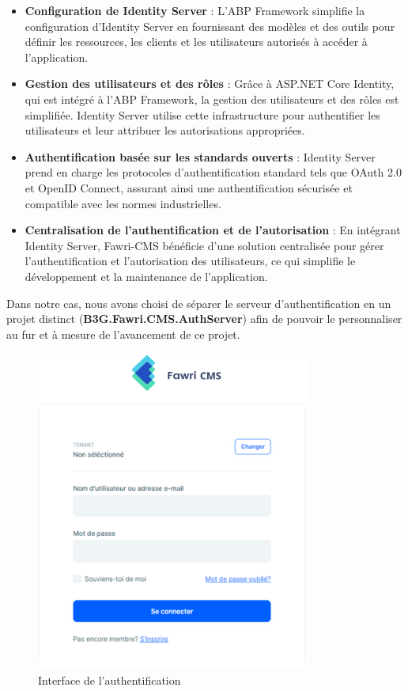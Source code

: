 \begin{itemize}
    \item \textbf{Configuration de Identity Server} : L'ABP Framework simplifie la configuration d'Identity Server en fournissant des modèles et des outils pour définir les ressources, les clients et les utilisateurs autorisés à accéder à l'application.

\item \textbf{Gestion des utilisateurs et des rôles} : Grâce à ASP.NET Core Identity, qui est intégré à l'ABP Framework, la gestion des utilisateurs et des rôles est simplifiée. Identity Server utilise cette infrastructure pour authentifier les utilisateurs et leur attribuer les autorisations appropriées.

\item \textbf{Authentification basée sur les standards ouverts} : Identity Server prend en charge les protocoles d'authentification standard tels que OAuth 2.0 et OpenID Connect, assurant ainsi une authentification sécurisée et compatible avec les normes industrielles.

\item \textbf{Centralisation de l'authentification et de l'autorisation} : En intégrant Identity Server, Fawri-CMS bénéficie d'une solution centralisée pour gérer l'authentification et l'autorisation des utilisateurs, ce qui simplifie le développement et la maintenance de l'application.
\end{itemize}

Dans notre cas, nous avons choisi de séparer le serveur d'authentification en un projet distinct (\textbf{B3G.Fawri.CMS.AuthServer}) afin de pouvoir le personnaliser au fur et à mesure de l'avancement de ce projet.


\begin{figure}[H] 
    \centering
    \includegraphics[width=9cm]{Figures/login ui.PNG}
    \caption{Interface de l'authentification}
\end{figure}


